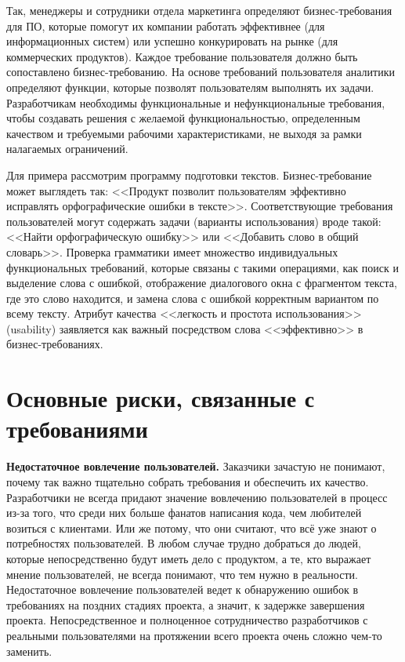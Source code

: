 \documentclass{../../text-style}
\begin{document}
Так, менеджеры и сотрудники отдела маркетинга определяют бизнес-требования для ПО, которые помогут их компании работать эффективнее (для информационных систем) или успешно конкурировать на рынке (для коммерческих продуктов). Каждое требование пользователя должно быть сопоставлено бизнес-требованию. На основе требований пользователя аналитики определяют функции, которые позволят пользователям выполнять их задачи. Разработчикам необходимы функциональные и нефункциональные требования, чтобы создавать решения с желаемой функциональностью, определенным качеством и требуемыми рабочими характеристиками, не выходя за рамки налагаемых ограничений.

Для примера рассмотрим программу подготовки текстов. Бизнес-требование может выглядеть так: <<Продукт позволит пользователям эффективно исправлять орфографические ошибки в тексте>>. Соответствующие требования пользователей могут содержать задачи (варианты использования) вроде такой: <<Найти орфографическую ошибку>> или <<Добавить слово в общий словарь>>. Проверка грамматики имеет множество индивидуальных функциональных требований, которые связаны с такими операциями, как поиск и выделение слова с ошибкой, отображение диалогового окна с фрагментом текста, где это слово находится, и замена слова с ошибкой корректным вариантом по всему тексту. Атрибут качества <<легкость и простота использования>> (usability) заявляется как важный посредством слова <<эффективно>> в бизнес-требованиях.

\section{Основные риски, связанные с требованиями}

\textbf{Недостаточное вовлечение пользователей.} Заказчики зачастую не понимают, почему так важно тщательно собрать требования и обеспечить их качество. Разработчики не всегда придают значение вовлечению пользователей в процесс из-за того, что среди них больше фанатов написания кода, чем любителей возиться с клиентами. Или же потому, что они считают, что всё уже знают о потребностях пользователей. В любом случае трудно добраться до людей, которые непосредственно будут иметь дело с продуктом, а те, кто выражает мнение пользователей, не всегда понимают, что тем нужно в реальности. Недостаточное вовлечение пользователей ведет к обнаружению ошибок в требованиях на поздних стадиях проекта, а значит, к задержке завершения проекта. Непосредственное и полноценное сотрудничество разработчиков с реальными пользователями на протяжении всего проекта очень сложно чем-то заменить.
\end{document}
